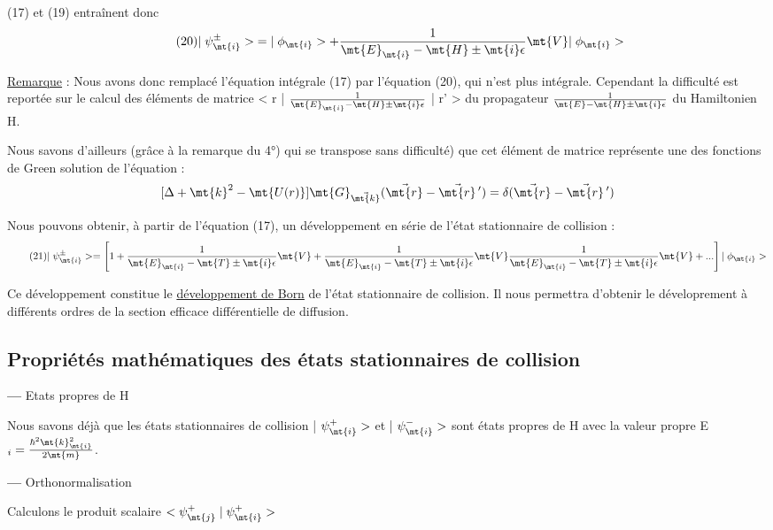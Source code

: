 (17) et (19) entraînent donc
\[
\tag{20}|\;\psi_\mt{i}^\pm>\;=|\;\phi_\mt{i}>+\frac{1}{\mt{E}_\mt{i}-\mt{H}\pm\mt{i}\epsilon}\mt{ V }|\;\phi_\mt{i}>
\]

\ul{Remarque} :
Nous avons donc remplacé l'équation intégrale (17) par l'équation (20),
qui n'est plus intégrale. Cependant la difficulté est reportée sur le calcul des
éléments de matrice < r | $\frac{1}{\mt{E}_\mt{i}-\mt{H}\pm\mt{i}\epsilon}$ | r' > du propagateur
$\frac{1}{\mt{E}-\mt{H}\pm\mt{i}\epsilon}$ du Hamiltonien H.


Nous savons d'ailleurs (grâce à la remarque du 4°) qui se transpose sans difficulté)
que cet élément de matrice représente une des fonctions
de Green solution de l'équation :
\[
[\Delta+\mt{k}^2-\mt{U(r)}]\mt{ G}_{\vec{\mt{k}}}(\vec{\mt{r}}-\vec{\mt{r}}\,')
=\delta(\vec{\mt{r}}-\vec{\mt{r}}\,')
\]

Nous pouvons obtenir, à partir de l'équation (17), un développement en série de
l'état stationnaire de collision :
\[
\tag{21}|\;\psi_\mt{i}^\pm>=\left[1+\frac{1}{\mt{E}_\mt{i}-\mt{T}\pm\mt{i}\epsilon}\mt{ V }+\frac{1}{\mt{E}_\mt{i}-\mt{T}\pm\mt{i}\epsilon}\mt{ V }\frac{1}{\mt{E}_\mt{i}-\mt{T}\pm\mt{i}\epsilon}\mt{ V }+...\right]|\;\phi_\mt{i}>
\]

Ce développement constitue le \ul{développement de Born} de l'état stationnaire
de collision. Il nous permettra d'obtenir le déveloprement à différents
ordres de la section efficace différentielle de diffusion.

\subsection{Propriétés mathématiques des états stationnaires de collision}%
{\bf—} Etats propres de H

Nous savons déjà que les états stationnaires de collision | $\psi_\mt{i}^+>$
et | $\psi_\mt{i}^->$ sont états propres de H avec la valeur propre E$_i=\frac{\hbar^2\mt{k}_\mt{i}^2}{2\mt{m}}$.

{\bf—} Orthonormalisation

Calculons le produit scalaire $<\psi_\mt{j}^+\;|\;\psi_\mt{i}^+>$

